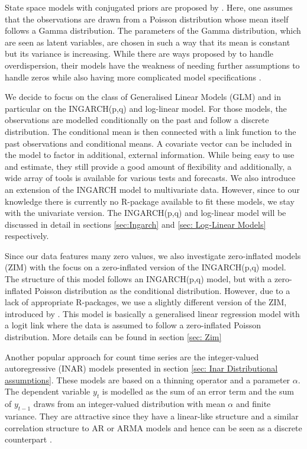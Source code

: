 State space models with conjugated priors are proposed by \cite{Harvey:1989}. Here, one assumes that the observations are drawn from a Poisson distribution whose mean itself follows a Gamma distribution. The parameters of the Gamma distribution, which are seen as latent variables, are chosen in such a way that its mean is constant but its variance is increasing. While there are ways proposed by \cite{Qaqish:1988} to handle overdispersion, their models have the weakness of needing further assumptions to handle zeros while also having more complicated model specifications \cite{Heinen:2003}.

We decide to focus on the class of Generalised Linear Models (GLM) and in particular on the INGARCH(p,q) and log-linear model. For those models, the observations are modelled conditionally on the past and follow a discrete distribution. The conditional mean is then connected with a link function to the past observations and conditional means. A covariate vector can be included in the model to factor in additional, external information. While being easy to use and estimate, they still provide a good amount of flexibility and additionally, a wide array of tools is available for various tests and forecasts. We also introduce an extension of the INGARCH model to multivariate data. However, since to our knowledge there is currently no R-package available to fit these models, we stay with the univariate version. The INGARCH(p,q) and log-linear model will be discussed in detail in sections \ref{sec:Ingarch} and \ref{sec: Log-Linear Models} respectively.

Since our data features many zero values, we also investigate zero-inflated models (ZIM) with the focus on a zero-inflated version of the INGARCH(p,q) model. The structure of this model follows an INGARCH(p,q) model, but with a zero-inflated Poisson distribution as the conditional distribution. However, due to a lack of appropriate R-packages, we use a slightly different version of the ZIM, introduced by \cite{Lambert:1992}. This model is basically a generalised linear regression model with a logit link where the data is assumed to follow a zero-inflated Poisson distribution. More details can be found in section \ref{sec: Zim}

Another popular approach for count time series are the integer-valued autoregressive (INAR) models presented in section \ref{sec: Inar Distributional assumptions}. These models are based on a thinning operator and a parameter $\alpha$. The dependent variable $y_t$ is modelled as the sum of an error term and the sum of $y_{t-1}$ draws from an integer-valued distribution with mean $\alpha$ and finite variance. They are attractive since they have a linear-like structure and a similar correlation structure to AR or ARMA models and hence can be seen as a discrete counterpart \cite{Heinen:2003}. 

